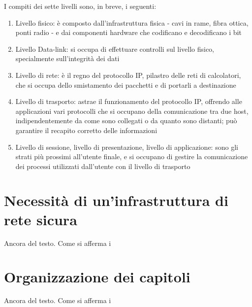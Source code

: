 I compiti dei sette livelli sono, in breve, i seguenti:
\begin{enumerate}
    \item Livello fisico: è composto dall'infrastruttura fisica - cavi in rame, fibra ottica, ponti radio - e dai componenti hardware che codificano e decodificano i bit
    \item Livello Data-link: si occupa di effettuare controlli sul livello fisico, specialmente sull'integrità dei dati
    \item Livello di rete: è il regno del protocollo IP, pilastro delle reti di calcolatori, che si occupa dello smistamento dei pacchetti e di portarli a destinazione
    \item Livello di trasporto: astrae il funzionamento del protocollo IP, offrendo alle applicazioni vari protocolli che si occupano della comunicazione tra due host, indipendentemente da come sono collegati o da quanto sono distanti; può garantire il recapito corretto delle informazioni
    \item Livello di sessione, livello di presentazione, livello di applicazione: sono gli strati più prossimi all'utente finale, e si occupano di gestire la comunicazione dei processi utilizzati dall'utente con il livello di trasporto
\end{enumerate}


\section{Necessità di un'infrastruttura di rete sicura}

Ancora del testo. Come si afferma i
\section{Organizzazione dei capitoli}

Ancora del testo. Come si afferma i

